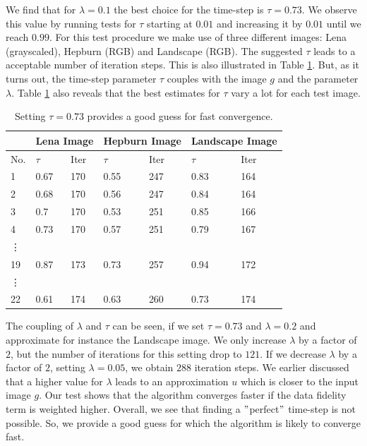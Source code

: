 \documentclass[abstracton]{scrreprt}
\begin{document}
            We find that for $\lambda = 0.1$ the best choice for the time-step is $\tau = 0.73$. We observe this value by running tests for $\tau$ starting at $0.01$ and increasing it by $0.01$ until we reach $0.99$. For this test procedure we make use of three different images: Lena (grayscaled), Hepburn (RGB) and Landscape (RGB). The suggested $\tau$ leads to a acceptable number of iteration steps. This is also illustrated in Table \ref{tab:estimation_of_tau_rof}. But, as it turns out, the time-step parameter $\tau$ couples with the image $g$ and the parameter $\lambda$. Table \ref{tab:estimation_of_tau_rof} also reveals that the best estimates for $\tau$ vary a lot for each test image.
            \begin{table}[!ht]
                \centering
                \begin{tabular}{| l | l | l | l | l | l | l |}
                    \hline
                    & \multicolumn{2}{|c|}{Lena Image} & \multicolumn{2}{|c|}{Hepburn Image} & \multicolumn{2}{|c|}{Landscape Image} \\ \hline\hline
                    No. & $\tau$ & Iter & $\tau$ & Iter & $\tau$ & Iter \\ \hline
                    1 & 0.67 & 170 & 0.55 & 247 & 0.83 & 164 \\ \hline
                    2 & 0.68 & 170 & 0.56 & 247 & 0.84 & 164 \\ \hline
                    3 & 0.7 & 170 & 0.53 & 251 & 0.85 & 166 \\ \hline
                    4 & 0.73 & 170 & 0.57 & 251 & 0.79 & 167 \\ \hline
                    \vdots &  &  &  &  &  & \\ \hline
                    19 & 0.87 & 173 & 0.73 & 257 & 0.94 & 172 \\ \hline
                    \vdots &  &  &  &  &  & \\ \hline
                    22 & 0.61 & 174 & 0.63 & 260 & 0.73 & 174 \\ \hline
                \end{tabular}
                \caption[Best estimate of $\tau$ for the ROF model.]{Setting $\tau = 0.73$ provides a good guess for fast convergence.}
                \label{tab:estimation_of_tau_rof}
            \end{table}
            The coupling of $\lambda$ and $\tau$ can be seen, if we set $\tau = 0.73$ and $\lambda = 0.2$ and approximate for instance the Landscape image. We only increase $\lambda$ by a factor of $2$, but the number of iterations for this setting drop to $121$. If we decrease $\lambda$ by a factor of $2$, setting $\lambda = 0.05$, we obtain $288$ iteration steps. We earlier discussed that a higher value for $\lambda$ leads to an approximation $u$ which is closer to the input image $g$. Our test shows that the algorithm converges faster if the data fidelity term is weighted higher. Overall, we see that finding a $"$perfect$"$ time-step is not possible. So, we provide a good guess for which the algorithm is likely to converge fast.\\
\end{document}
